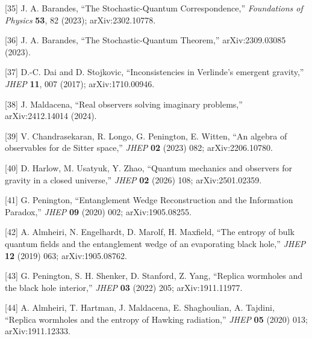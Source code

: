 \documentclass[
]{article}
\begin{document}
{[}35{]} J. A. Barandes, ``The Stochastic-Quantum Correspondence,''
\emph{Foundations of Physics} \textbf{53}, 82 (2023); arXiv:2302.10778.

{[}36{]} J. A. Barandes, ``The Stochastic-Quantum Theorem,''
arXiv:2309.03085 (2023).

{[}37{]} D.-C. Dai and D. Stojkovic, ``Inconsistencies in Verlinde's
emergent gravity,'' \emph{JHEP} \textbf{11}, 007 (2017);
arXiv:1710.00946.

{[}38{]} J. Maldacena, ``Real observers solving imaginary problems,''
arXiv:2412.14014 (2024).

{[}39{]} V. Chandrasekaran, R. Longo, G. Penington, E. Witten, ``An
algebra of observables for de Sitter space,'' \emph{JHEP} \textbf{02}
(2023) 082; arXiv:2206.10780.

{[}40{]} D. Harlow, M. Usatyuk, Y. Zhao, ``Quantum mechanics and
observers for gravity in a closed universe,'' \emph{JHEP} \textbf{02}
(2026) 108; arXiv:2501.02359.

{[}41{]} G. Penington, ``Entanglement Wedge Reconstruction and the
Information Paradox,'' \emph{JHEP} \textbf{09} (2020) 002;
arXiv:1905.08255.

{[}42{]} A. Almheiri, N. Engelhardt, D. Marolf, H. Maxfield, ``The
entropy of bulk quantum fields and the entanglement wedge of an
evaporating black hole,'' \emph{JHEP} \textbf{12} (2019) 063;
arXiv:1905.08762.

{[}43{]} G. Penington, S. H. Shenker, D. Stanford, Z. Yang, ``Replica
wormholes and the black hole interior,'' \emph{JHEP} \textbf{03} (2022)
205; arXiv:1911.11977.

{[}44{]} A. Almheiri, T. Hartman, J. Maldacena, E. Shaghoulian, A.
Tajdini, ``Replica wormholes and the entropy of Hawking radiation,''
\emph{JHEP} \textbf{05} (2020) 013; arXiv:1911.12333.
\end{document}
